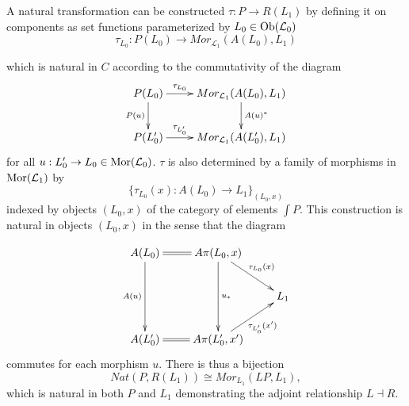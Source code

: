 \begin{frame}
\iftoggle{thmsty}{
\begin{proof}
\label{proof-cocompletion-adjunction}
}{}
A natural transformation can be constructed $\tau : P \rightarrow R(L_1)$ by defining it on components as set functions parameterized by $L_0 \in \mathop{\rm Ob}\nolimits(\mathcal{L}_0)$
$$
\tau_{L_0} : P(L_0) \rightarrow Mor_{\mathcal{L}_1}(A(L_0),L_1)
$$
\end{frame}

\begin{frame}
which is natural in $C$ according to the commutativity of the diagram
$$
\xymatrix{
P(L_0) \ar[r]^-{\tau_{L_0}} \ar[d]_{P(u)} & Mor_{\mathcal{L}_1}(A(L_0),L_1) \ar[d]^{A(u)^*} \\
P(L'_0) \ar[r]^-{\tau_{L'_0}} & Mor_{\mathcal{L}_1}(A(L'_0),L_1) }
$$
for all $u:L'_0 \rightarrow L_0 \in \mathop{\rm Mor}\nolimits(\mathcal{L}_0)$. $\tau$ is also determined by a family of morphisms in $\mathop{\rm Mor}\nolimits(\mathcal{L}_1)$ by
$$
\{ \tau_{L_0}(x):A(L_0) \rightarrow L_1 \}_{(L_0,x)}
$$
indexed by objects $(L_0,x)$ of the category of elements $\int P$. This construction is natural in objects $(L_0,x)$ in the sense that the diagram
\end{frame}

\begin{frame}
$$
\xymatrix{
A(L_0) \ar@{=}[r] \ar[dd]_{A(u)} & A\pi(L_0,x) \ar[rd]^{\tau_{L_0}(x)} \ar[dd]^{u_*} & \\
& & L_1 \\
A(L'_0) \ar@{=}[r] & A\pi(L'_0,x') \ar[ru]_{\tau_{L'_0}(x')} &
}
$$
commutes for each morphism $u$. There is thus a bijection
$$
Nat(P,R(L_1)) \cong Mor_{L_1}(LP,L_1),
$$
which is natural in both $P$ and $L_1$ demonstrating the adjoint relationship $L \dashv R$.
\end{frame}


